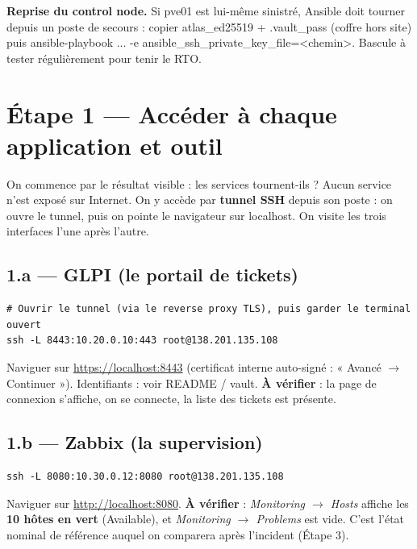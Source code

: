 \documentclass[11pt,a4paper]{article}
\newcommand{\cmd}[1]{{\ttfamily #1}}
\begin{document}
\begin{attention}
\textbf{Reprise du control node.} Si \cmd{pve01} est lui-même sinistré, Ansible doit
tourner depuis un poste de secours : copier \cmd{atlas_ed25519} + \cmd{.vault_pass}
(coffre hors site) puis \cmd{ansible-playbook ... -e ansible_ssh_private_key_file=<chemin>}.
Bascule à tester régulièrement pour tenir le RTO.
\end{attention}

\section{Étape 1 — Accéder à chaque application et outil}
\begin{etape}{On commence par le résultat visible : les services tournent-ils ?}
Aucun service n'est exposé sur Internet. On y accède par \textbf{tunnel SSH} depuis son
poste : on ouvre le tunnel, puis on pointe le navigateur sur \cmd{localhost}. On visite
les trois interfaces l'une après l'autre.
\end{etape}

\subsection{1.a — GLPI (le portail de tickets)}
\begin{lstlisting}[style=bash]
# Ouvrir le tunnel (via le reverse proxy TLS), puis garder le terminal ouvert
ssh -L 8443:10.20.0.10:443 root@138.201.135.108
\end{lstlisting}
Naviguer sur \url{https://localhost:8443} (certificat interne auto-signé : « Avancé
$\rightarrow$ Continuer »). Identifiants : voir README / vault. \textbf{À vérifier} : la
page de connexion s'affiche, on se connecte, la liste des tickets est présente.

\subsection{1.b — Zabbix (la supervision)}
\begin{lstlisting}[style=bash]
ssh -L 8080:10.30.0.12:8080 root@138.201.135.108
\end{lstlisting}
Naviguer sur \url{http://localhost:8080}. \textbf{À vérifier} : \emph{Monitoring
$\rightarrow$ Hosts} affiche les \textbf{10 hôtes en vert} (\cmd{Available}), et
\emph{Monitoring $\rightarrow$ Problems} est vide. C'est l'état nominal de référence
auquel on comparera après l'incident (Étape 3).
\end{document}
